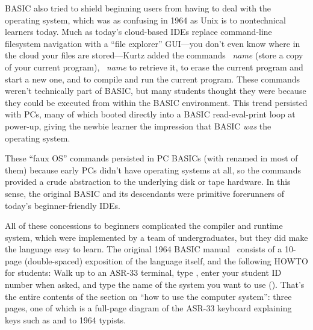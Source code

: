 
BASIC also tried to shield beginning users from having to deal with the
operating system, which was as confusing in 1964 as Unix is to
nontechnical learners today.
Much as today's cloud-based IDEs replace command-line filesystem
navigation with a ``file explorer'' GUI---you don't even know where in
the cloud your files are stored---Kurtz added the commands
~\emph{name} (store a copy of your current program),
~\emph{name} to retrieve it,  to erase the current program
and start a new one, and  to compile and run the current program.
These commands weren't technically part of BASIC, but many students
thought they were because they could be executed from within the BASIC
environment.  This trend persisted with PCs, many of which booted
directly into a BASIC read-eval-print loop at power-up, giving the
newbie learner the impression that BASIC \emph{was} the operating system.


These ``faux OS'' commands persisted in PC BASICs (with  renamed
 in 
most of them) because early PCs didn't have operating systems at all, so
the commands provided a crude abstraction to the underlying disk or tape
hardware.
In this sense, the original BASIC and its descendants were primitive
forerunners of today's beginner-friendly IDEs.

All of these concessions to beginners complicated the compiler and
runtime system, which were
implemented by a team of undergraduates,
but they did make the language easy to learn.
The original 1964 BASIC manual~\cite[p. 14]{dartmouth_basic_manual}
consists of a 10-page (double-spaced) exposition of the language
itself, and the following HOWTO for students:
Walk up to an ASR-33 terminal, type , enter your student ID
number when asked, and type the name of the system you want to use
().
That's the entire contents of the section on ``how to use the computer
system'': three pages, one of which is a full-page diagram of the ASR-33
keyboard explaining keys such as  and  to 1964
typists.

